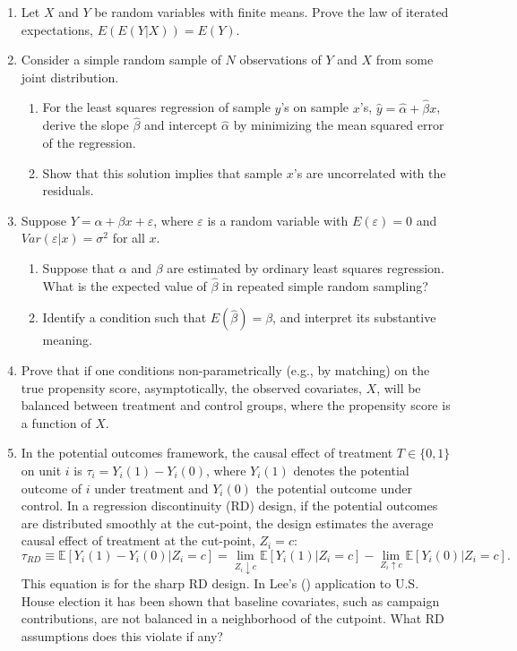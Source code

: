 \documentclass[fleqn,titlepage,12pt]{article}
\begin{document}
\begin{enumerate}
\item Let $X$ and $Y$ be random variables with finite means. Prove the law of iterated expectations, $E(E(Y|X)) = E(Y)$. 

\item Consider a simple random sample of $N$ observations of $Y$ and $X$ from some joint distribution. 
\begin{enumerate}
\item For the least squares regression of sample $y$'s on sample $x$'s, $\widehat{y} = \widehat{\alpha} + \widehat{\beta} x$, derive the slope $\widehat{\beta}$ and intercept $\widehat{\alpha}$ by minimizing the mean squared error of the regression.
\item Show that this solution implies that sample $x$'s are uncorrelated with the residuals.
\end{enumerate}

\item Suppose $Y = \alpha + \beta x + \varepsilon$, where $\varepsilon$ is a random variable with $E(\varepsilon) = 0$ and $Var(\varepsilon|x) = \sigma^2$ for all $x$. 
\begin{enumerate}
\item Suppose that $\alpha$ and $\beta$ are estimated by ordinary least squares regression. What is the expected value of $\widehat{\beta}$ in repeated simple random sampling?
\item Identify a condition such that $E(\widehat{\beta}) = \beta$, and interpret its substantive meaning.
\end{enumerate}

\item Prove that if one conditions non-parametrically (e.g., by
  matching) on the true propensity score, asymptotically, the observed
  covariates, $X$, will be balanced between treatment and control
  groups, where the propensity score is a function of $X$.

\item In the potential outcomes framework, the causal effect of
  treatment $T \in \{ 0,1\}$ on unit $i$ is $\tau_{i} =
  Y_{i}(1)-Y_{i}(0)$, where $Y_{i}(1)$ denotes the potential outcome
  of $i$ under treatment and $Y_{i}(0)$ the potential outcome under
  control. In a regression discontinuity (RD) design, if the potential
  outcomes are distributed smoothly at the cut-point, the design
  estimates the average causal effect of treatment at the cut-point,
  $Z_{i} = c$:
\begin{equation}
  \tau_{RD} \equiv \mathbb{E}[Y_{i}(1) - Y_{i}(0) | Z_{i} = c] = 
  \lim_{Z_{i} \downarrow c}\mathbb{E}[Y_{i}(1) | Z_{i} = c] -
  \lim_{Z_{i} \uparrow c}\mathbb{E}[Y_{i}(0) | Z_{i} = c].
  \label{eq:rd}
\end{equation}
This equation is for the sharp RD design. In Lee's (\citeyear{leeRD})
application to U.S. House election it has been shown that baseline
covariates, such as campaign contributions, are not balanced in a
neighborhood of the cutpoint. What RD assumptions does this violate if
any?


\end{enumerate}
\end{document}
